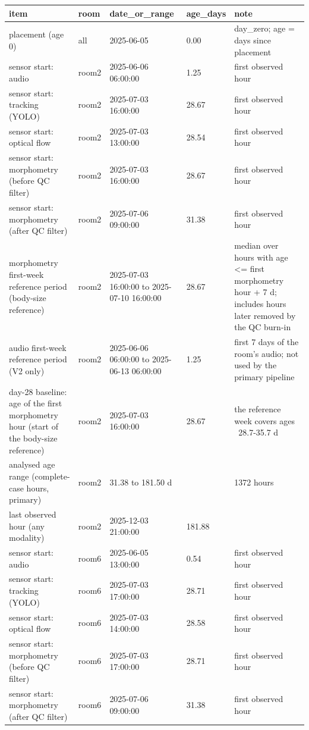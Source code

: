 \begin{tabular}{lllll}
\hline
item & room & date\_or\_range & age\_days & note \\
\hline
placement (age 0) & all & 2025-06-05 & 0.00 & day\_zero; age = days since placement \\
sensor start: audio & room2 & 2025-06-06 06:00:00 & 1.25 & first observed hour \\
sensor start: tracking (YOLO) & room2 & 2025-07-03 16:00:00 & 28.67 & first observed hour \\
sensor start: optical flow & room2 & 2025-07-03 13:00:00 & 28.54 & first observed hour \\
sensor start: morphometry (before QC filter) & room2 & 2025-07-03 16:00:00 & 28.67 & first observed hour \\
sensor start: morphometry (after QC filter) & room2 & 2025-07-06 09:00:00 & 31.38 & first observed hour \\
morphometry first-week reference period (body-size reference) & room2 & 2025-07-03 16:00:00 to 2025-07-10 16:00:00 & 28.67 & median over hours with age <= first morphometry hour + 7 d; includes hours later removed by the QC burn-in \\
audio first-week reference period (V2 only) & room2 & 2025-06-06 06:00:00 to 2025-06-13 06:00:00 & 1.25 & first 7 days of the room's audio; not used by the primary pipeline \\
day-28 baseline: age of the first morphometry hour (start of the body-size reference) & room2 & 2025-07-03 16:00:00 & 28.67 & the reference week covers ages ~28.7-35.7 d \\
analysed age range (complete-case hours, primary) & room2 & 31.38 to 181.50 d &  & 1372 hours \\
last observed hour (any modality) & room2 & 2025-12-03 21:00:00 & 181.88 &  \\
sensor start: audio & room6 & 2025-06-05 13:00:00 & 0.54 & first observed hour \\
sensor start: tracking (YOLO) & room6 & 2025-07-03 17:00:00 & 28.71 & first observed hour \\
sensor start: optical flow & room6 & 2025-07-03 14:00:00 & 28.58 & first observed hour \\
sensor start: morphometry (before QC filter) & room6 & 2025-07-03 17:00:00 & 28.71 & first observed hour \\
sensor start: morphometry (after QC filter) & room6 & 2025-07-06 09:00:00 & 31.38 & first observed hour \\

\end{tabular}
